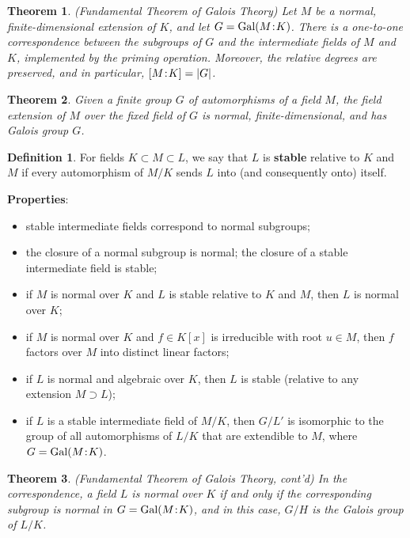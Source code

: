 \documentclass[11pt]{amsart}
\newtheorem*{theorem*}{Theorem}
\theoremstyle{definition}
\newtheorem*{definition*}{Definition}
\renewcommand\:{\colon}
\newcommand{\1}{\mathds{1}}
\renewcommand{\d}[2]{[#1 \hspace{-.2em} : \hspace{-.2em} #2]}
\newcommand{\Gal}[2]{\text{Gal}(#1 \hspace{-.2em} : \hspace{-.2em} #2)}
\begin{document}
\begin{theorem*}
	\textnormal{(Fundamental Theorem of Galois Theory)} Let $M$ be a normal, finite-dimensional extension of $K$, and let $G = \Gal MK$. There is a one-to-one correspondence between the subgroups of $G$ and the intermediate fields of $M$ and $K$, implemented by the priming operation. Moreover, the relative degrees are preserved, and in particular, $\d MK = |G|$.
\end{theorem*}

\begin{theorem*}
	Given a finite group $G$ of automorphisms of a field $M$, the field extension of $M$ over the fixed field of $G$ is normal, finite-dimensional, and has Galois group $G$.
\end{theorem*}
\vskip40pt

\begin{definition*}
	For fields $K \subset M \subset L$, we say that $L$ is \textbf{stable} relative to $K$ and $M$ if every automorphism of $M / K$ sends $L$ into (and consequently onto) itself.
\end{definition*}

\noindent \textbf{Properties}:
\begin{itemize}[leftmargin=*]\setlength\itemsep{0em}
	\item stable intermediate fields correspond to normal subgroups;
	\item the closure of a normal subgroup is normal; the closure of a stable intermediate field is stable;
	\item if $M$ is normal over $K$ and $L$ is stable relative to $K$ and $M$, then $L$ is normal over $K$;
	\item if $M$ is normal over $K$ and $f \in K[x]$ is irreducible with root $u \in M$, then $f$ factors over $M$ into distinct linear factors;
	\item if $L$ is normal and algebraic over $K$, then $L$ is stable (relative to any extension $M \supset L$);
	\item if $L$ is a stable intermediate field of $M/K$, then $G/L'$ is isomorphic to the group of all automorphisms of $L/K$ that are extendible to $M$, where $G = \Gal MK$.
\end{itemize}

\begin{theorem*}
	(\textnormal{Fundamental Theorem of Galois Theory, cont'd}) In the correspondence, a field $L$ is normal over $K$ if and only if the corresponding subgroup is normal in $G = \Gal MK$, and in this case, $G/H$ is the Galois group of $L/K$.
\end{theorem*}
\vskip40pt
\end{document}
